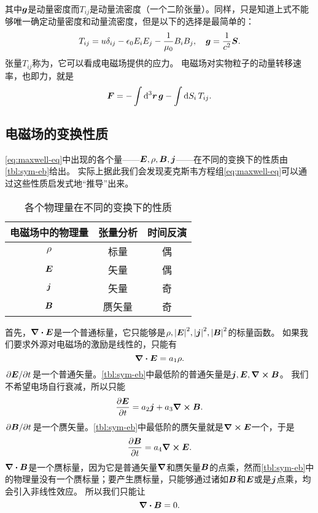 其中$\vb*{g}$是动量密度而$T_{ij}$是动量流密度（一个二阶张量）。同样，只是知道上式不能够唯一确定动量密度和动量流密度，但是以下的选择是最简单的：
\begin{equation}
    T_{ij} = u \delta_{ij} - \epsilon_0 E_i E_j - \frac{1}{\mu_0} B_i B_j, \quad \vb*{g} = \frac{1}{c^2} \vb*{S}.
\end{equation}
张量$T_{ij}$称为，它可以看成电磁场提供的应力。
电磁场对实物粒子的动量转移速率，也即力，就是
\begin{equation}
    \vb*{F} = - \int \dd[3]{\vb*{r}} \vb*{g} - \int \dd{S_i} T_{ij}.
\end{equation}

\subsection{电磁场的变换性质}

\eqref{eq:maxwell-eq}中出现的各个量——$\vb*{E}, \rho, \vb*{B}, \vb*{j}$——在不同的变换下的性质由\autoref{tbl:sym-eb}给出。
实际上据此我们会发现麦克斯韦方程组\eqref{eq:maxwell-eq}可以通过这些性质启发式地“推导”出来。

\begin{table}
    \centering
    \caption{各个物理量在不同的变换下的性质}
    \label{tbl:sym-eb}
    \begin{tabular}[c]{ccc}
        \toprule
        电磁场中的物理量 & 张量分析 & 时间反演 \\
        \midrule
        $\rho$ & 标量 & 偶 \\
        $\vb*{E}$ & 矢量 & 偶 \\
        $\vb*{j}$ & 矢量 & 奇 \\
        $\vb*{B}$ & 赝矢量 & 奇 \\
        \bottomrule
    \end{tabular}
\end{table}

首先，$\div{\vb*{E}}$是一个普通标量，它只能够是$\rho, \abs{\vb*{E}}^2, \abs{\vb*{j}}^2, \abs{\vb*{B}}^2$的标量函数。
如果我们要求外源对电磁场的激励是线性的，只能有
\[
    \div{\vb*{E}} = a_1 \rho.
\]
$\pdv*{\vb*{E}}{t}$是一个普通矢量。\autoref{tbl:sym-eb}中最低阶的普通矢量是$\vb*{j}, \vb*{E}, \curl{\vb*{B}}$。
我们不希望电场自行衰减，所以只能
\[
    \pdv{\vb*{E}}{t} = a_2 \vb*{j} + a_3 \curl{\vb*{B}}.
\]
$\pdv*{\vb*{B}}{t}$是一个赝矢量。\autoref{tbl:sym-eb}中最低阶的赝矢量就是$\curl{\vb*{E}}$一个，于是
\[
    \pdv{\vb*{B}}{t} = a_4 \curl{\vb*{E}}.
\]
$\div{\vb*{B}}$是一个赝标量，因为它是普通矢量$\grad$和赝矢量$\vb*{B}$的点乘，然而\autoref{tbl:sym-eb}中的物理量没有一个赝标量；要产生赝标量，只能够通过诸如$\vb*{B}$和$\vb*{E}$或是$\vb*{j}$点乘，均会引入非线性效应。
所以我们只能让
\[
    \div{\vb*{B}} = 0.
\]

